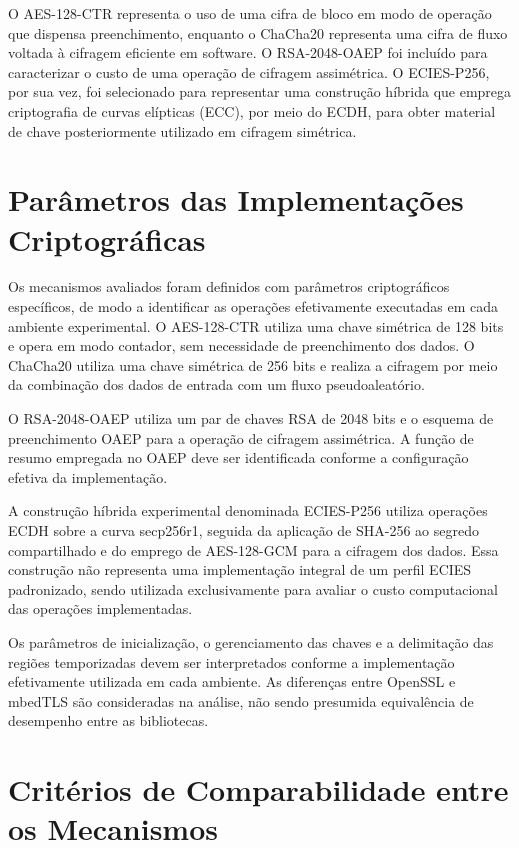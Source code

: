 O AES-128-CTR representa o uso de uma cifra de bloco em modo de operação que dispensa preenchimento, enquanto o ChaCha20 representa uma cifra de fluxo voltada à cifragem eficiente em software. O RSA-2048-OAEP foi incluído para caracterizar o custo de uma operação de cifragem assimétrica. O ECIES-P256, por sua vez, foi selecionado para representar uma construção híbrida que emprega criptografia de curvas elípticas (ECC), por meio do ECDH, para obter material de chave posteriormente utilizado em cifragem simétrica.

\section{Parâmetros das Implementações Criptográficas}

Os mecanismos avaliados foram definidos com parâmetros criptográficos específicos, de modo a identificar as operações efetivamente executadas em cada ambiente experimental. O AES-128-CTR utiliza uma chave simétrica de 128 bits e opera em modo contador, sem necessidade de preenchimento dos dados. O ChaCha20 utiliza uma chave simétrica de 256 bits e realiza a cifragem por meio da combinação dos dados de entrada com um fluxo pseudoaleatório.

O RSA-2048-OAEP utiliza um par de chaves RSA de 2048 bits e o esquema de preenchimento OAEP para a operação de cifragem assimétrica. A função de resumo empregada no OAEP deve ser identificada conforme a configuração efetiva da implementação.

A construção híbrida experimental denominada ECIES-P256 utiliza operações ECDH sobre a curva secp256r1, seguida da aplicação de SHA-256 ao segredo compartilhado e do emprego de AES-128-GCM para a cifragem dos dados. Essa construção não representa uma implementação integral de um perfil ECIES padronizado, sendo utilizada exclusivamente para avaliar o custo computacional das operações implementadas.

Os parâmetros de inicialização, o gerenciamento das chaves e a delimitação das regiões temporizadas devem ser interpretados conforme a implementação efetivamente utilizada em cada ambiente. As diferenças entre OpenSSL e mbedTLS são consideradas na análise, não sendo presumida equivalência de desempenho entre as bibliotecas.

\section{Critérios de Comparabilidade entre os Mecanismos}

